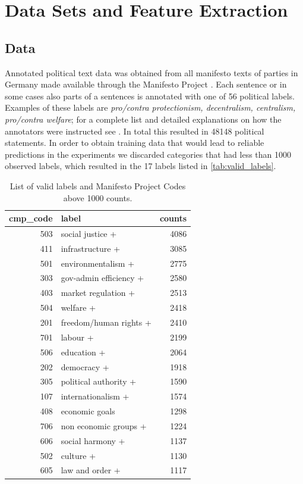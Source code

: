 \documentclass[runningheads,a4paper]{article}
\begin{document}
\section{Data Sets and Feature Extraction}\label{sec:data}
%

\subsection{Data}
Annotated political text data was obtained from all manifesto texts of parties in Germany made available through the Manifesto Project \cite{manifesto}. 
Each sentence or in some cases also parts of a sentences is annotated with one of 56 political labels. Examples of these labels are {\em pro/contra protectionism, decentralism, centralism, pro/contra welfare}; for a complete list and detailed explanations on how the annotators were instructed see \cite{leftright}. In total this resulted in 48148 political statements. In order to obtain training data that would lead to reliable predictions in the experiments we discarded categories that had less than 1000 observed labels, which resulted in the 17 labels listed in \autoref{tab:valid_labels}.

\begin{table}
\centering
\label{tab:valid_labels} 

\begin{tabular}{rlr}
\toprule
 cmp\_code &                   label &  counts \\
\midrule
      503 &        social justice + &    4086 \\
      411 &        infrastructure + &    3085 \\
      501 &      environmentalism + &    2775 \\
      303 &  gov-admin efficiency + &    2580 \\
      403 &     market regulation + &    2513 \\
      504 &               welfare + &    2418 \\
      201 &  freedom/human rights + &    2410 \\
      701 &                labour + &    2199 \\
      506 &             education + &    2064 \\
      202 &             democracy + &    1918 \\
      305 &   political authority + &    1590 \\
      107 &      internationalism + &    1574 \\
      408 &          economic goals &    1298 \\
      706 &   non economic groups + &    1224 \\
      606 &        social harmony + &    1137 \\
      502 &               culture + &    1130 \\
      605 &         law and order + &    1117 \\
\bottomrule
\end{tabular}
\caption{List of valid labels and Manifesto Project Codes above 1000 counts.}
\end{table}
\end{document}
